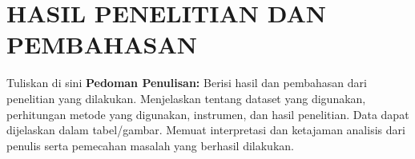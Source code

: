\chapter{HASIL PENELITIAN DAN PEMBAHASAN}


Tuliskan di sini \textbf{Pedoman Penulisan:} Berisi hasil dan pembahasan dari penelitian yang dilakukan. Menjelaskan tentang dataset yang digunakan, perhitungan metode yang digunakan, instrumen, dan hasil penelitian. Data dapat dijelaskan dalam tabel/gambar. Memuat interpretasi dan ketajaman analisis dari penulis serta pemecahan masalah yang berhasil dilakukan.


